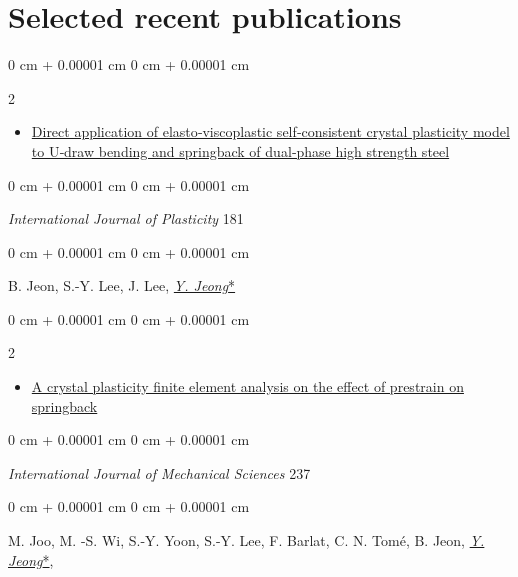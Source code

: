 \documentclass[10pt, letterpaper]{article}
\newenvironment{highlights}{
    \begin{itemize}[
        topsep=0.10 cm,
        parsep=0.10 cm,
        partopsep=0pt,
        itemsep=0pt,
        leftmargin=0 cm + 10pt
    ]
}{
    \end{itemize}
} %
\newenvironment{onecolentry}{
    \begin{adjustwidth}{
        0 cm + 0.00001 cm
    }{
        0 cm + 0.00001 cm
    }
}{
    \end{adjustwidth}
} %
\newenvironment{twocolentry}[2][]{
    \onecolentry
    \def\secondColumn{#2}
    \setcolumnwidth{\fill, 4.5 cm}
    \begin{paracol}{2}
}{
    \switchcolumn \raggedleft \secondColumn
    \end{paracol}
    \endonecolentry
} %
\begin{document}
    \section{Selected recent publications}
        \begin{samepage}
            \begin{twocolentry}{2024}
                \begin{highlights}
                \item\href{https://doi.org/10.1016/j.ijplas.2024.104098}{Direct application of elasto‑viscoplastic self‑consistent crystal plasticity model to U‑draw bending and springback of dual‑phase high strength steel}
                \end{highlights}
            \end{twocolentry}
            \begin{onecolentry}
                {\it International Journal of Plasticity} 181
            \end{onecolentry}
            \begin{onecolentry}
                B. Jeon, S.-Y. Lee, J. Lee, {\underline{\textit{Y. Jeong}*}}
            \end{onecolentry}
            \vspace{0.10 cm}

            \begin{twocolentry}{2023}
                \begin{highlights}
                \item\href{https://doi.org/10.1016/j.ijmecsci.2022.107796}{A crystal plasticity finite element analysis on the effect of prestrain on springback}
                \end{highlights}
            \end{twocolentry}
            \begin{onecolentry}
                {\it International Journal of Mechanical Sciences} 237
              \end{onecolentry}
            \begin{onecolentry}
                M. Joo, M. -S. Wi, S.-Y. Yoon, S.-Y. Lee, F. Barlat, C. N. Tomé, B. Jeon, {\underline{\textit{Y. Jeong}*}},
             \end{onecolentry}
            \vspace{0.10 cm}


\end{samepage}
\end{document}
